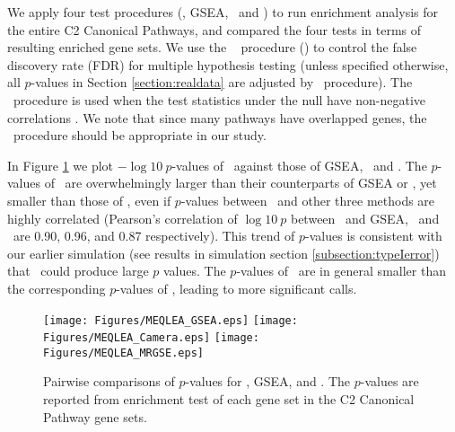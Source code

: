	We apply four test procedures (\OurMethod, GSEA, \CMT~and \genr) to run enrichment analysis 
	for	the entire C2 Canonical Pathways, and compared the four tests in terms of resulting
	enriched gene sets. %
	We use the \FDR~\citep{benjamini1995controlling} procedure (\FDRabb) to control the false
	discovery rate (FDR) for multiple hypothesis testing (unless specified otherwise, all 
	$p$-values in Section \ref{section:realdata} are adjusted by \FDRabb~procedure). The 
	\FDRabb~procedure is used when the test statistics under the null have non-negative 
	correlations \citep{benjamini2001control}. We note that since many pathways have overlapped 
	genes, the \FDRabb~procedure should be appropriate in our study.
	
	In Figure \ref{fig:HDdatap} we plot $-\log 10~p$-values of \OurMethod~against those of GSEA, 
	\CMT~and \genr.
	The $p$-values of \CMT~are overwhelmingly larger than their counterparts of GSEA or \OurMethod, 
	yet smaller than those of \genr, even 
	if $p$-values between \OurMethod~and other three methods are highly correlated (Pearson's 
	correlation of $\log 10 ~p$ between \OurMethod~and GSEA, \CMT~and \genr~are 0.90, 0.96, and 
	0.87 respectively). This trend of $p$-values is consistent with our earlier simulation (see 
	results in simulation section \ref{subsection:typeIerror}) that
	\CMT~could produce large $p$ values. The $p$-values of \genr~are in general smaller than the 
	corresponding $p$-values of \OurMethod, leading to more significant calls. 
	
	\begin{figure}[h!]
		\begin{center}
			\texttt{[image: Figures/MEQLEA\_GSEA.eps]}
			\texttt{[image: Figures/MEQLEA\_Camera.eps]}
			\texttt{[image: Figures/MEQLEA\_MRGSE.eps]}
		\end{center} 
		\caption[Pairwise comparisons of $p$-values for different methods]{Pairwise comparisons of 
		$p$-values for \OurMethod, GSEA, \CMT and \genr. The $p$-values 
		are reported from enrichment test of each gene set in the C2 Canonical Pathway gene sets.
		}\label{fig:HDdatap}
	\end{figure} 
	
